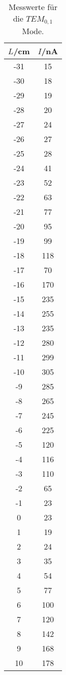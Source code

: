 \begin{table}[htp]
	\begin{center}
    \caption{Messwerte für die $TEM_{0,1}$ Mode.}
    \label{tab:tem00a}
		\begin{tabular}{cc}
		\toprule
			{$L$/cm} & {$I$/nA}\\
			\midrule
			-31 & 15\\
			-30 & 18\\
			-29 & 19\\
			-28 & 20\\
			-27 & 24\\
			-26 & 27\\
			-25 & 28\\
			-24 & 41\\
			-23 & 52\\
			-22 & 63\\
			-21 & 77\\
			-20 & 95\\
			-19 & 99\\
			-18 & 118\\
			-17 & 70\\
			-16 & 170\\
			-15 & 235\\
			-14 & 255\\
			-13 & 235\\
			-12 & 280\\
			-11 & 299\\
			-10 & 305\\
			-9 & 285\\
			-8 & 265\\
			-7 & 245\\
			-6 & 225\\
			-5 & 120\\
			-4 & 116\\
			-3 & 110\\
			-2 & 65\\
			-1 & 23\\
			0 & 23\\
			1 & 19\\
			2 & 24\\
			3 & 35\\
			4 & 54\\
			5 & 77\\
			6 & 100\\
			7 & 120\\
			8 & 142\\
			9 & 168\\
			10 & 178\\
		\bottomrule
		\end{tabular}
	\end{center}
\end{table}


